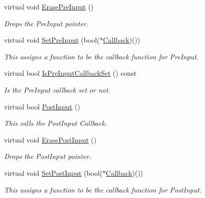 \begin{DoxyCompactItemize}
virtual void \hyperlink{classphys_1_1CallBackManager_ae3da6f1eb10cdf4d8551aaeeda73053c}{ErasePreInput} ()
\begin{DoxyCompactList}\small\item\em Drops the PreInput pointer. \item\end{DoxyCompactList}\item 
virtual void \hyperlink{classphys_1_1CallBackManager_a1efb0c185304376986093beebf08a277}{SetPreInput} (bool($\ast$\hyperlink{classphys_1_1ManagerBase_a753f5f0127131529767beab2502f480b}{Callback})())
\begin{DoxyCompactList}\small\item\em This assigns a function to be the callback function for PreInput. \item\end{DoxyCompactList}\item 
virtual bool \hyperlink{classphys_1_1CallBackManager_adf39c71f0be97bcceb364621d1ccd77e}{IsPreInputCallbackSet} () const 
\begin{DoxyCompactList}\small\item\em Is the PreInput callback set or not. \item\end{DoxyCompactList}\item 
virtual bool \hyperlink{classphys_1_1CallBackManager_a83afb36cfc7e71863d68a8b4c1d5e9d2}{PostInput} ()
\begin{DoxyCompactList}\small\item\em This calls the PostInput Callback. \item\end{DoxyCompactList}\item 
virtual void \hyperlink{classphys_1_1CallBackManager_a84ccf382be58b42439869ec9b77a0f89}{ErasePostInput} ()
\begin{DoxyCompactList}\small\item\em Drops the PostInput pointer. \item\end{DoxyCompactList}\item 
virtual void \hyperlink{classphys_1_1CallBackManager_abbf73a7199a64d6a2a39c7de44c5acd6}{SetPostInput} (bool($\ast$\hyperlink{classphys_1_1ManagerBase_a753f5f0127131529767beab2502f480b}{Callback})())
\begin{DoxyCompactList}\small\item\em This assigns a function to be the callback function for PostInput. \item\end{DoxyCompactList}\item 

\end{DoxyCompactItemize}
